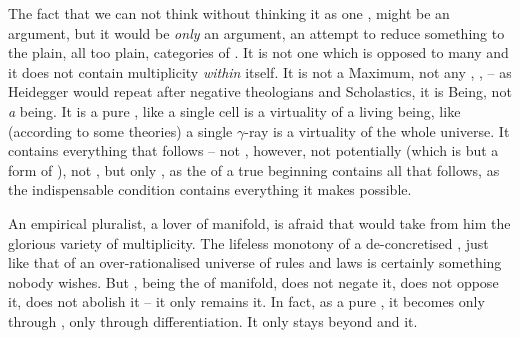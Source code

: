 \pa The fact that we can not think  without thinking it as one
, might be an argument, but it would be {\em only} an argument, an
attempt to reduce something  to the plain, all too plain,
categories of .  It is not one which is
opposed to many and it does not contain multiplicity {\em within} itself. It is
not a Maximum, not any , ,  -- as Heidegger would repeat after negative theologians and
Scholastics, it is Being, not {\em a} being.  It is a pure , like
a single cell is a virtuality of a living being, like (according to some
theories) a single $\gamma$-ray is a virtuality of the whole universe.  It
contains everything that follows -- not , however, not potentially
(which is but a form of ), not , but only
, as the  of a true beginning contains all that
follows, as the indispensable condition contains everything it makes possible.

An empirical pluralist, a lover of manifold, is afraid that  would take
from him the glorious variety of  multiplicity.  The lifeless
monotony of a de-concretised , just like that of an over-rationalised
universe of rules and laws is certainly something nobody wishes.  But ,
being the  of manifold, does not negate it, does not oppose
it, does not abolish it -- it only remains  it. In
fact, as a pure , it becomes  only through
, only through differentiation. It only stays beyond and 
it.



